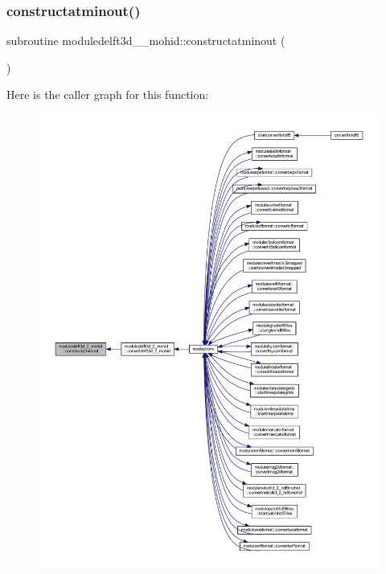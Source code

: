 \subsubsection{\texorpdfstring{constructatminout()}{constructatminout()}}
{\footnotesize\ttfamily subroutine moduledelft3d\+\_\+\_\+mohid\+::constructatminout (\begin{DoxyParamCaption}{ }\end{DoxyParamCaption})\hspace{0.3cm}{\ttfamily [private]}}

Here is the caller graph for this function\+:\nopagebreak
\begin{figure}[H]
\begin{center}
\leavevmode
\includegraphics[width=350pt]{namespacemoduledelft3d__2__mohid_a7da2fd030b83e9111c17fd1699358aea_icgraph}
\end{center}
\end{figure}
\mbox{\label{namespacemoduledelft3d__2__mohid_aff52824d2be1932406d107d88fa23498}} 
